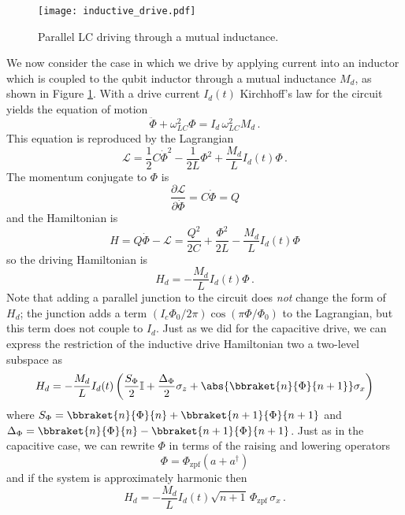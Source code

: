 
\begin{figure}
\begin{centering}
\texttt{[image: inductive\_drive.pdf]}
\par\end{centering}
  \caption{Parallel LC driving through a mutual inductance.}
\label{fig:qubits.inductive_drive}
\end{figure}

We now consider the case in which we drive by applying current into an inductor which is coupled to the qubit inductor through a mutual inductance $M_d$, as shown in Figure \ref{fig:qubits.inductive_drive}.
With a drive current $I_d(t)$ Kirchhoff's law for the circuit yields the equation of motion
\begin{equation}
  \ddot{\Phi} + \omega_{LC}^2 \Phi = I_d \, \omega_{LC}^2 M_d \, .
\end{equation}
This equation is reproduced by the Lagrangian
\begin{equation}
  \mathcal{L} = \frac{1}{2}C \dot{\Phi}^2 - \frac{1}{2L} \Phi^2 + \frac{M_d}{L}I_d(t) \Phi \, .
\end{equation}
The momentum conjugate to $\Phi$ is
\begin{equation}
  \frac{\partial \mathcal{L}}{\partial \dot{\Phi}} = C \dot{\Phi} = Q
\end{equation}
and the Hamiltonian is
\begin{equation}
  H
  = Q \dot{\Phi} - \mathcal{L}
  = \frac{Q^2}{2C} + \frac{\Phi^2}{2L} - \frac{M_d}{L} I_d(t) \Phi
\end{equation}
so the driving Hamiltonian is
\begin{equation}
  H_d = - \frac{M_d}{L}I_d(t) \Phi \, .
\end{equation}
Note that adding a parallel junction to the circuit does \emph{not} change the form of $H_d$; the junction adds a term $(I_c \Phi_0 / 2\pi)\cos(\pi \Phi / \Phi_0)$ to the Lagrangian, but this term does not couple to $I_d$.
Just as we did for the capacitive drive, we can express the restriction of the inductive drive Hamiltonian two a two-level subspace as
\begin{equation*}
  H_d = -\frac{M_d}{L} I_d(t) \left(
      \frac{S_\Phi}{2} \mathbb{I}
    + \frac{\Delta_\Phi}{2} \sigma_z
    + \abs{\bbraket{n}{\Phi}{n+1}} \sigma_x
  \right)
\end{equation*}
where $S_\Phi = \bbraket{n}{\Phi}{n} + \bbraket{n+1}{\Phi}{n+1}$ and $\Delta_\Phi = \bbraket{n}{\Phi}{n} - \bbraket{n+1}{\Phi}{n+1}$.
Just as in the capacitive case, we can rewrite $\Phi$ in terms of the raising and lowering operators
\begin{equation*}
  \Phi = \Phi_\text{zpf} (a + a^\dagger)
\end{equation*}
and if the system is approximately harmonic then
\begin{equation*}
  H_d = - \frac{M_d}{L} I_d(t) \sqrt{n+1} \, \Phi_\text{zpf} \, \sigma_x
  \, .
\end{equation*}
